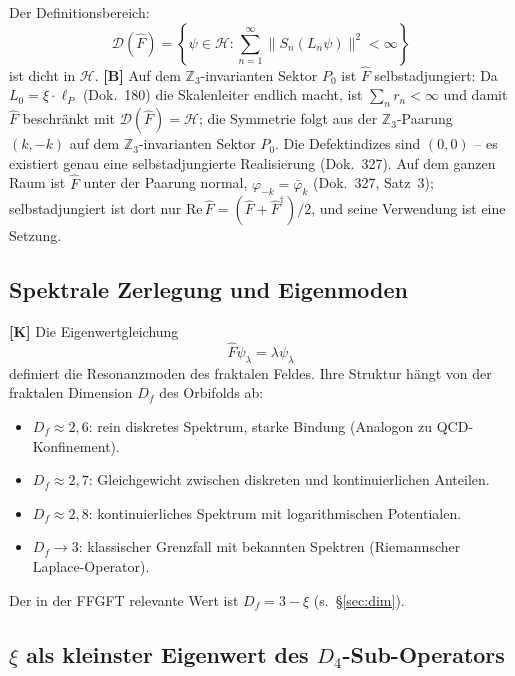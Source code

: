Der Definitionsbereich:
\begin{equation}
  \mathcal{D}(\hat{F}) = \left\{ \psi \in \mathcal{H} :
  \sum_{n=1}^{\infty} \| S_n (L_n \psi) \|^2 < \infty \right\}
  \label{eq:Ddef}
\end{equation}
ist dicht in $\mathcal{H}$. \textbf{[B]} Auf dem $\mathbb{Z}_3$-invarianten Sektor $P_0$ ist $\hat{F}$ selbstadjungiert:
Da $L_0 = \xi\cdot\ell_P$ (Dok.~180) die Skalenleiter endlich macht, ist
$\sum_n r_n < \infty$ und damit $\hat{F}$ beschränkt mit
$\mathcal{D}(\hat{F}) = \mathcal{H}$; die Symmetrie folgt aus der
$\mathbb{Z}_3$-Paarung $(k,-k)$ auf dem $\mathbb{Z}_3$-invarianten Sektor $P_0$. Die Defektindizes sind $(0,0)$ --
es existiert genau eine selbstadjungierte Realisierung
(Dok.~327). Auf dem ganzen Raum ist $\hat{F}$ unter der Paarung normal,
$\varphi_{-k}=\bar\varphi_k$ (Dok.~327, Satz~3); selbstadjungiert ist dort nur
$\mathrm{Re}\,\hat{F} = (\hat{F}+\hat{F}^\dagger)/2$, und seine Verwendung ist eine Setzung.

\subsection{Spektrale Zerlegung und Eigenmoden}

\textbf{[K]} Die Eigenwertgleichung
\begin{equation}
  \hat{F} \psi_\lambda = \lambda \psi_\lambda
  \label{eq:eigen}
\end{equation}
definiert die Resonanzmoden des fraktalen Feldes. Ihre Struktur hängt
von der fraktalen Dimension $D_f$ des Orbifolds ab:
\begin{itemize}
  \item $D_f \approx 2{,}6$: rein diskretes Spektrum, starke Bindung
    (Analogon zu QCD-Konfinement).
  \item $D_f \approx 2{,}7$: Gleichgewicht zwischen diskreten und
    kontinuierlichen Anteilen.
  \item $D_f \approx 2{,}8$: kontinuierliches Spektrum mit
    logarithmischen Potentialen.
  \item $D_f \to 3$: klassischer Grenzfall mit bekannten Spektren
    (Riemannscher Laplace-Operator).
\end{itemize}

Der in der FFGFT relevante Wert ist $D_f = 3 - \xi$ (s.\ §\ref{sec:dim}).

\subsection{$\xi$ als kleinster Eigenwert des $D_4$-Sub-Operators}

